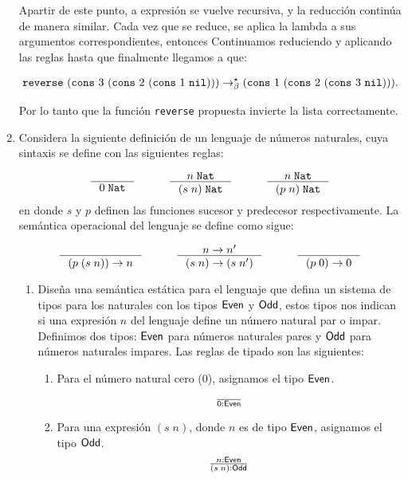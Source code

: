 \documentclass{article}
\begin{document}
\begin{enumerate}
        Apartir de este punto, a expresión se vuelve recursiva, y la reducción continúa de manera similar. Cada vez que se reduce, se aplica la lambda a sus argumentos correspondientes, entonces Continuamos reduciendo y aplicando las reglas hasta que finalmente llegamos a que:
 
        \[{\tt reverse}\,\, ({\tt cons}\,\, 3\,\, ({\tt cons}\,\, 2\,\, ({\tt cons}\,\, 1\,\, {\tt nil}))) \to^\star_\beta ({\tt cons}\,\, 1\,\, ({\tt cons}\,\, 2\,\, ({\tt cons}\,\, 3\,\, {\tt nil}))).\]

        Por lo tanto que la función {\tt reverse} propuesta invierte la lista correctamente.\\

        \item Considera la siguiente definición de un lenguaje de números naturales, cuya sintaxis se define con las siguientes reglas:

         \[
        \begin{array}{ccccc}
            \inference{}{0\;\tt{Nat}}&
            \quad&
            \inference{n\;\tt{Nat}}{(s\;n)\;\tt{Nat}}&
            \quad&
            \inference{n\;\tt{Nat}}{(p\;n)\;\tt{Nat}}
        \end{array}
        \]
        \noindent
        en donde $s$ y $p$ definen las funciones sucesor y predecesor respectivamente. La semántica operacional del lenguaje se define como sigue:

        \[
        \begin{array}{ccccc}
            \inference{}{(p\;(s\;n))\to n}&
            \quad&
            \inference{n\to n'}{(s\;n)\to(s\;n')}&
            \quad&
            \inference{}{(p\;0)\to 0}
        \end{array}
        \]

        \begin{enumerate}
            \item Diseña una semántica estática para el lenguaje que defina un sistema de tipos para los naturales con los tipos ${\sf Even}$ y ${\sf Odd}$, estos tipos nos indican si una expresión $n$ del lenguaje define un número natural par o impar.
            Definimos dos tipos: ${\sf Even}$ para números naturales pares y ${\sf Odd}$ para números naturales impares. Las reglas de tipado son las siguientes:

            \begin{enumerate}
                \item Para el número natural cero ($0$), asignamos el tipo ${\sf Even}$.
                \[
                \begin{array}{c}
                    \frac{}{0 : {\sf Even}}
                \end{array}
                \]
                \item Para una expresión $(s\;n)$, donde $n$ es de tipo ${\sf Even}$, asignamos el tipo ${\sf Odd}$.
                \[
                \begin{array}{c}
                    \frac{n : {\sf Even}}{(s\;n) : {\sf Odd}}
                \end{array}
                \]


\end{enumerate}
\end{enumerate}
\end{enumerate}
\end{document}
